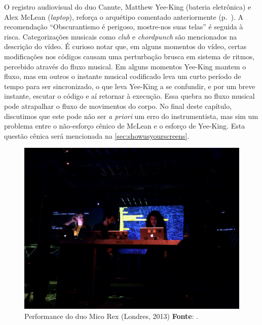 O registro audiovisual do duo Canute, Matthew Yee-King (bateria eletrônica) e Alex McLean (\emph{laptop}), reforça o arquétipo comentado anteriormente (p.~\pageref{fig:weaving}). A recomendação ``Obscurantismo é perigoso, mostre-nos suas telas''\label{sec:showusyourscreens} é seguida à risca. Categorizações musicais como \emph{club} e \emph{chordpunch} são mencionados na descrição do vídeo. É curioso notar que, em alguns momentos do vídeo, certas modificações nos códigos causam uma perturbação brusca em sistema de ritmos, percebido através do fluxo musical. Em alguns momentos Yee-King mantem o fluxo, mas em outros o instante musical codificado leva um curto período de tempo para ser sincronizado, o que leva Yee-King a se confundir, e por um breve instante, escutar o código e aí retornar à execução. Essa quebra no fluxo musical pode atrapalhar o fluxo de movimentos do corpo. No final deste capítulo, discutimos que este pode não ser \emph{a priori} um erro do instrumentista, mas sim um problema entre o não-esforço cênico de McLean e o esforço de Yee-King. Esta questão cênica será mencionada na \autoref{sec:showusyourscreens}.

\begin{figure}[h]
  \centering
  \includegraphics[scale=0.3]{imagens/cardenas.jpg}
  \caption{Performance do duo Mico Rex (Londres, 2013) \textbf{Fonte}: .}
  \label{fig:cardenas}
\end{figure}

